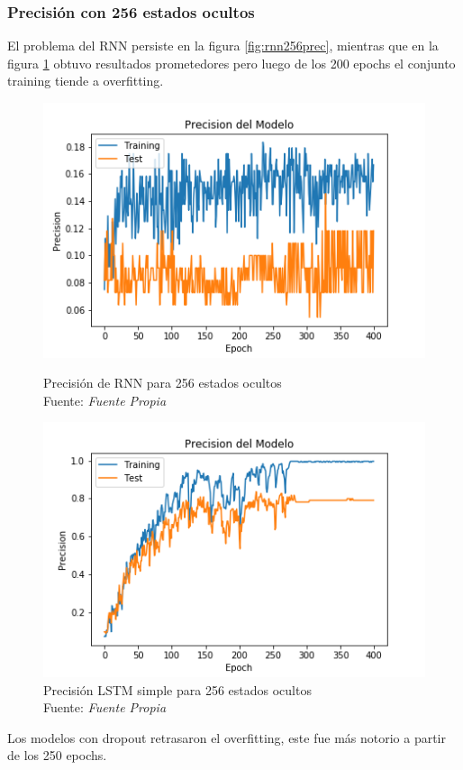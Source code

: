 \subsubsection{Precisión con 256 estados ocultos}
El problema del RNN persiste en la figura \ref{fig:rnn256prec}, mientras que en la figura  \ref{fig:lstm256prec13} obtuvo resultados prometedores pero luego de los 200 epochs el conjunto training tiende a overfitting.
\begin{figure}[H]
	\centering
	\includegraphics[width=0.7\linewidth]{Figures/rnn_256_prec}
	\caption{Precisión de RNN para 256 estados ocultos\\ Fuente: {\textit{Fuente Propia}}}
	\label{fig:rnn256prec}
	\centering
	\includegraphics[width=0.7\linewidth]{Figures/lstm_256_prec13}
	\caption{Precisión LSTM simple para 256 estados ocultos\\ Fuente: {\textit{Fuente Propia}}}
	\label{fig:lstm256prec13}
\end{figure}
\newpage
 Los modelos con dropout retrasaron el overfitting, este fue más notorio a partir de los 250 epochs.
